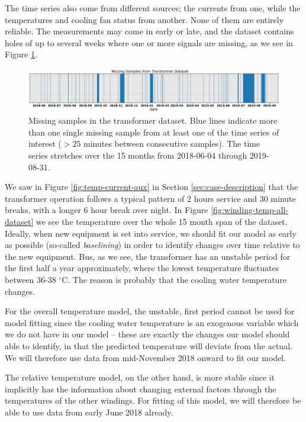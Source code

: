 \documentclass[]{article}
\begin{document}
The time series also come from different sources; the currents from one, while the temperatures and cooling fan status from another. None of them are entirely reliable. The measurements may come in early or late, and the dataset contains holes of up to several weeks where one or more signals are missing, as we see in Figure \ref{fig:missing-samples}.

\begin{figure}[!h]
	\centering
	\includegraphics[width=1\linewidth]{./figs/missing-samples.png}
	\caption{Missing samples in the transformer dataset. Blue lines indicate more than one single missing sample from at least one of the time series of interest ($>25$ minutes between consecutive samples). The time series stretches over the 15 months from 2018-06-04 through 2019-08-31.}
	\label{fig:missing-samples}
\end{figure}


We saw in Figure \ref{fig:temp-current-aux} in Section \ref{sec:case-description} that the transformer operation follows a typical pattern of 2 hours service and 30 minute breaks, with a longer 6 hour break over night. In Figure \ref{fig:winding-temp-all-dataset} we see the temperature over the whole 15 month span of the dataset. Ideally, when new equipment is set into service, we should fit our model as early as possible (so-called \textit{baselining}) in order to identify changes over time relative to the new equipment. Bus, as we see, the transformer has an unstable period for the first half a year approximately, where the lowest temperature fluctuates between 36-38 $^\circ$C. The reason is probably that the cooling water temperature changes. 

For the overall temperature model, the unstable, first period cannot be used for model fitting since the cooling water temperature is an exogenous variable which we do not have in our model -- these are exactly the changes our model should able to identify, in that the predicted temperature will deviate from the actual. We will therefore use data from mid-November 2018 onward to fit our model.

The relative temperature model, on the other hand, is more stable since it implicitly has the information about changing external factors through the temperatures of the other windings. For fitting of this model, we will therefore be able to use data from early June 2018 already.
\end{document}
